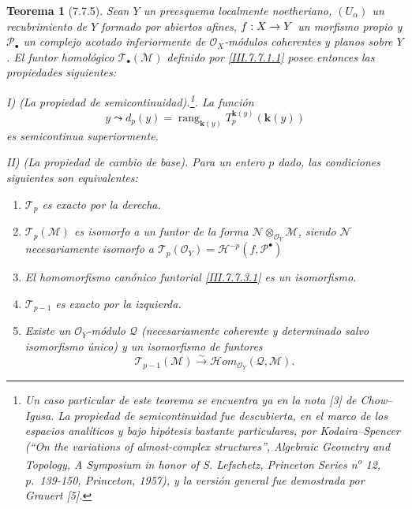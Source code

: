 \documentclass[10pt,oneside,openany]{book}
\theoremstyle{egaenv}\newtheorem*{env}{---}
\theoremstyle{egastatement}
\newtheorem*{theorem}{Teorema}
\theoremstyle{egadescription}
\newcommand{\oldpage}[2][]{\marginnote{\normalfont\scriptsize\textbf{#1}\,|\,#2}\ignorespaces}
\renewcommand{\to}{\mathchoice{\longrightarrow}{\rightarrow}{\rightarrow}{\rightarrow}}
\begin{document}
\begin{theorem}[7.7.5]
\label{III.7.7.5}
Sean $Y$ un preesquema localmente noetheriano, $(U_\alpha)$ un recubrimiento
de $Y$ formado por abiertos afines, $f:X\to Y$ un morfismo propio y
$\mathscr P_\bullet$ un complejo acotado inferiormente de
$\mathscr O_X$-módulos coherentes y planos sobre $Y$. El funtor homológico
$\mathscr T_\bullet(\mathscr M)$ definido por \eqref{III.7.7.1.1} posee
entonces las propiedades siguientes:

\medskip
\noindent
\textnormal{I) (La propiedad de semicontinuidad).}\footnote{Un caso particular
de este teorema se encuentra ya en la nota [3] de Chow--Igusa. La propiedad de
semicontinuidad fue descubierta, en el marco de los espacios analíticos y bajo
hipótesis bastante particulares, por Kodaira--Spencer (``On the variations of
almost-complex structures'', \emph{Algebraic Geometry and Topology, A Symposium
in honor of S. Lefschetz}, Princeton Series n\textsuperscript{o} 12,
p.~139-150, Princeton, 1957), y la versión general fue demostrada por Grauert
[5].}.
La función
\[
  y\leadsto
  d_p(y)
  =
  \operatorname{rang}_{\mathbf{k}(y)}
    T_p^{\mathbf{k}(y)}(\boldsymbol{k}(y))
  \tag{7.7.5.1}\label{III.7.7.5.1.fr}
\]
es semicontinua superiormente.

\oldpage[III]{200}
\medskip
\noindent
\textnormal{II) (La propiedad de cambio de base).}
Para un entero $p$ dado, las condiciones siguientes son equivalentes:
\begin{enumerate}
  \item[\textup{a)}] $\mathscr T_p$ es exacto por la derecha.

  \item[\textup{a$'$)}] $\mathscr T_p(\mathscr M)$ es isomorfo a un funtor de la forma
    $\mathscr N\otimes_{\mathscr O_Y}\mathscr M$, siendo $\mathscr N$
    necesariamente isomorfo a
    $\mathscr T_p(\mathscr O_Y)=\mathscr H^{-p}(f,\mathscr P^\bullet)$

  \item[\textup{a$''$)}] El homomorfismo canónico funtorial
    \eqref{III.7.7.3.1} es un isomorfismo.

  \item[\textup{b)}] $\mathscr T_{p-1}$ es exacto por la izquierda.

  \item[\textup{b$'$)}] Existe un $\mathscr O_Y$-módulo $\mathscr Q$ (necesariamente
    coherente y determinado salvo isomorfismo único) y un isomorfismo de
    funtores
    \[
      \mathscr T_{p-1}(\mathscr M)
      \xrightarrow{\sim}
      \mathscr{H}\!om_{\mathscr O_Y}(\mathscr Q,\mathscr M).
      \tag{7.7.5.2}\label{III.7.7.5.2.fr}
    \]


\end{enumerate}
\end{theorem}
\end{document}
